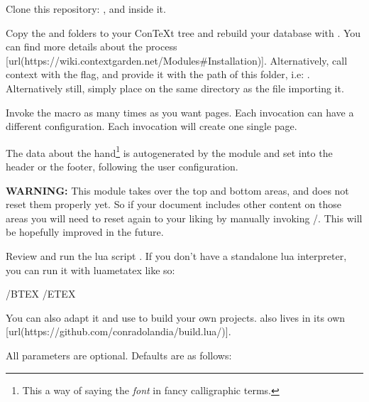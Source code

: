 \startenumerate[n,packed][stopper=.]
\item
  Clone this repository: , and  inside it.
\item
  Copy the  and  folders to your ConTeXt tree and rebuild your database with . You can find more details about the process [url(https://wiki.contextgarden.net/Modules\#Installation)]. Alternatively, call context with the  flag, and provide it with the path of this folder, i.e: . Alternatively still, simply place  on the same directory as the file importing it.
\item
  Invoke the \type{\Pauta} macro as many times as you want pages. Each invocation can have a different configuration. Each invocation will create one single page.
\item
  The data about the hand\footnote{This a way of saying the {\em font} in fancy calligraphic terms.} is autogenerated by the module and set into the header or the footer, following the user configuration.
\item
  {\bf WARNING:} This module takes over the top and bottom areas, and does not reset them properly yet. So if your document includes other content on those areas you will need to reset again to your liking by manually invoking \type{\setuptoptexts}/\type{\setupbottomtexts}. This will be hopefully improved in the future.
\stopenumerate

\stopsection

\startsection[title={Generating the example file},reference={generating-the-example-file}]

Review and run the lua script . If you don't have a standalone lua interpreter, you can run it with luametatex like so:

\starthighlighting
/BTEX /ETEX
\stophighlighting

You can also adapt it and use to build your own projects.  also lives in its own [url(https://github.com/conradolandia/build.lua/)].

\stopsection

\startsection[title={Configuration Parameters},reference={configuration-parameters}]

All parameters are optional. Defaults are as follows:

